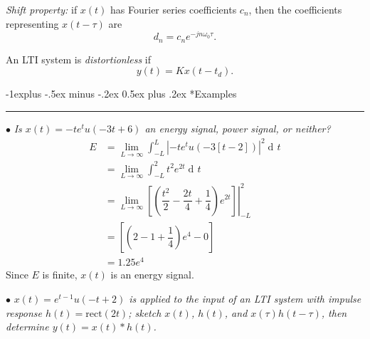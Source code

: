 \documentclass[10pt,letterpaper]{article}
\makeatletter
\DeclareMathOperator{\di}{d\!} %
\newcommand{\Eval}[3]{\left.#1\right\rvert_{#2}^{#3}} %
\newcommand{\sumi}[1][1]{ \sum_{n={#1}}^{\infty} } %
\newcommand{\limi}[1][T]{ \lim_{{#1}\to\infty} } %
\newcommand{\bracks}[1]{ \left( #1 \right) } %
\newcommand{\abs}[1]{\left| #1 \right|} %
\newcommand{\sbracks}[1]{\left[ #1 \right]} %
\newcommand{\xabs}{ \abs{x(t)}^2 }
\newcommand{\rect}{ \text{rect} }
\newcommand{\Iint}{ \int_{-\infty}^{\infty} }
\newcommand{\Uint}{ \int\displaylimits_{<\!T\!>} }
\newcommand{\omegaE}{ e^{jn\omega_0t} }
\newcommand{\underlineSection}[1][unnamed]{
\subsection*{#1}
\hrule
\vspace{12pt}
}
\renewcommand{\subsection}{\@startsection{subsection}{2}{0mm}%
                                {-1explus -.5ex minus -.2ex}%
                                {0.5ex plus .2ex}%
                                {\normalfont\normalsize\bfseries}}
\makeatother
\begin{document}
\begin{multicols*}{3}
\textit{Shift property:} if $x(t)$ has Fourier series coefficients $c_n$, then the coefficients representing $x(t-\tau)$ are
\[ d_n = c_n e^{-jn\omega_0\tau}. \]






An LTI system is \textit{distortionless} if
\[ y(t) = Kx(t-t_d). \]


\underlineSection[Examples]
$\bullet$ \textit{Is $x(t) = -te^tu(-3t+6)$ an energy signal, power signal, or neither?}
\begin{align*}
	E &= \limi[L] \int_{-L}^{L}  \abs{ -te^tu\bracks{-3\sbracks{t-2}} }^2 \di t \\
	&= \limi[L] \int_{-L}^{2} t^2e^{2t} \di t \\
	&= \limi[L] \Eval{ \sbracks{ \bracks{ \dfrac{t^2}{2} - \dfrac{2t}{4} + \dfrac{1}{4} }e^{2t} } }{-L}{2} \\ 
	&= \sbracks{ \bracks{2 - 1 + \dfrac{1}{4}}e^4 - 0 } \\ 
	&= 1.25e^4
\end{align*}
Since $E$ is finite, $x(t)$ is an energy signal.

$\bullet$ \textit{$x(t) = e^{t-1}u(-t+2)$ is applied to the input of an LTI system with impulse response $h(t) = \rect(2t)$; sketch $x(t)$, $h(t)$, and $x(\tau)h(t-\tau)$, then determine $y(t) = x(t)*h(t)$.}


\end{multicols*}
\end{document}
